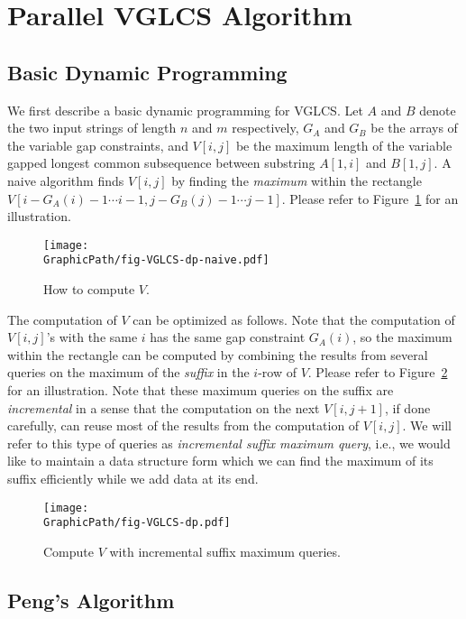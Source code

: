 \section{Parallel VGLCS Algorithm} \label{sec:parallelVGLCS}

\subsection{Basic Dynamic Programming}

We first describe a basic dynamic programming for VGLCS.  Let $A$ and
$B$ denote the two input strings of length $n$ and $m$ respectively,
$G_A$ and $G_B$ be the arrays of the variable gap constraints, and
$V[i, j]$ be the maximum length of the variable gapped longest common
subsequence between substring $A[1, i]$ and $B[1, j]$.  A naive
algorithm finds $V[i, j]$ by finding the {\em maximum} within the
rectangle $V[i-G_A(i)-1 \cdots i-1, j-G_B(j)-1 \cdots j-1]$.  Please
refer to Figure~\ref{fig:fig-VGLCS-dp-naive} for an illustration.

\begin{figure}[!thb]
  \texttt{[image: \\GraphicPath/fig-VGLCS-dp-naive.pdf]}
  \caption{How to compute $V$.}
  \label{fig:fig-VGLCS-dp-naive}
\end{figure}

The computation of $V$ can be optimized as follows.  Note that the
computation of $V[i, j]$'s with the same $i$ has the same gap
constraint $G_A(i)$, so the maximum within the rectangle can be
computed by combining the results from several queries on the maximum
of the {\em suffix} in the $i$-row of $V$.  Please refer to
Figure~\ref{fig:fig-VGLCS-dp} for an illustration.  Note that these
maximum queries on the suffix are {\em incremental} in a sense that
the computation on the next $V[i, j + 1]$, if done carefully, can
reuse most of the results from the computation of $V[i, j]$.  We will
refer to this type of queries as {\em incremental suffix maximum
  query}, i.e., we would like to maintain a data structure form which
we can find the maximum of its suffix efficiently while we add data at
its end.

\begin{figure}[!thb]
  \texttt{[image: \\GraphicPath/fig-VGLCS-dp.pdf]}
  \caption{Compute $V$ with incremental suffix maximum queries.}
  \label{fig:fig-VGLCS-dp}
\end{figure}

\subsection{Peng's Algorithm}

